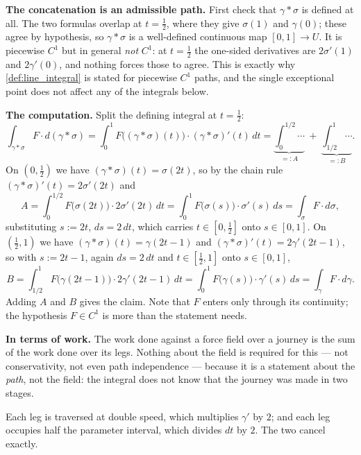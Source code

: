 \begin{exercisesolution}
\label{sol:path_concatenation_work}
\textbf{The concatenation is an admissible path.} First check that $\gamma * \sigma$ is defined at
all. The two formulas overlap at $t = \tfrac12$, where they give $\sigma(1)$ and $\gamma(0)$; these
agree by hypothesis, so $\gamma*\sigma$ is a well-defined continuous map $[0,1] \to U$. It is
piecewise $C^1$ but in general \emph{not} $C^1$: at $t=\tfrac12$ the one-sided derivatives are
$2\sigma'(1)$ and $2\gamma'(0)$, and nothing forces those to agree. This is exactly why
\cref{def:line_integral} is stated for piecewise $C^1$ paths, and the single exceptional point does
not affect any of the integrals below.

\textbf{The computation.} Split the defining integral at $t = \tfrac12$:
\[\int_{\gamma*\sigma} F \cdot d(\gamma*\sigma)
  = \int_0^{1} F\big((\gamma*\sigma)(t)\big)\cdot(\gamma*\sigma)'(t)\,dt
  = \underbrace{\int_0^{1/2}\!\!\cdots}_{=:A} \ +\ \underbrace{\int_{1/2}^{1}\!\!\cdots}_{=:B}.\]
On $(0,\tfrac12)$ we have $(\gamma*\sigma)(t) = \sigma(2t)$, so by the chain rule
$(\gamma*\sigma)'(t) = 2\sigma'(2t)$ and
\[A = \int_0^{1/2} F\big(\sigma(2t)\big)\cdot 2\sigma'(2t)\,dt
    = \int_0^1 F\big(\sigma(s)\big)\cdot\sigma'(s)\,ds = \int_\sigma F\cdot d\sigma,\]
substituting $s := 2t$, $ds = 2\,dt$, which carries $t \in [0,\tfrac12]$ onto $s \in [0,1]$. On
$(\tfrac12,1)$ we have $(\gamma*\sigma)(t) = \gamma(2t-1)$ and $(\gamma*\sigma)'(t) =
2\gamma'(2t-1)$, so with $s := 2t-1$, again $ds = 2\,dt$ and $t \in [\tfrac12,1]$ onto
$s \in [0,1]$,
\[B = \int_{1/2}^{1} F\big(\gamma(2t-1)\big)\cdot 2\gamma'(2t-1)\,dt
    = \int_0^1 F\big(\gamma(s)\big)\cdot\gamma'(s)\,ds = \int_\gamma F\cdot d\gamma.\]
Adding $A$ and $B$ gives the claim. Note that $F$ enters only through its continuity; the
hypothesis $F \in C^1$ is more than the statement needs.

\textbf{In terms of work.} The work done against a force field over a journey is the sum of the
work done over its legs. Nothing about the field is required for this --- not conservativity, not
even path independence --- because it is a statement about the \emph{path}, not the field: the
integral does not know that the journey was made in two stages.
\begin{remark}
\label{rem:line_integral_reparametrisation_invariance}
Each leg is traversed at double speed, which multiplies $\gamma'$ by $2$; and each leg occupies
half the parameter interval, which divides $dt$ by $2$. The two cancel exactly.


\end{remark}
\end{exercisesolution}
